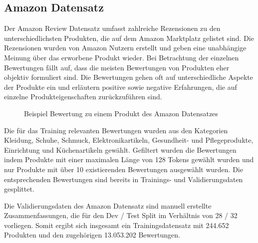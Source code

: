 \subsection{Amazon Datensatz}
Der Amazon Review Datensatz \citep{brazinskas2020-unsupervised} umfasst zahlreiche Rezensionen zu den unterschiedlichsten Produkten, die auf dem Amazon Marktplatz gelistet sind.
Die Rezensionen wurden von Amazon Nutzern erstellt und geben eine unabhängige Meinung über das erworbene Produkt wieder.
Bei Betrachtung der einzelnen Bewertungen fällt auf, dass die meisten Bewertungen von Produkten eher objektiv formuliert sind. 
Die Bewertungen gehen oft auf unterschiedliche Aspekte der Produkte ein und erläutern positive sowie negative Erfahrungen, die auf einzelne Produkteigenschaften zurückzuführen sind.

\setlength{\fboxsep}{1em}

\begin{figure}[!h]
    \centering
    \scriptsize
    \caption{Beispiel Bewertung zu einem Produkt des Amazon Datensatzes}
\end{figure}

Die für das Training relevanten Bewertungen wurden aus den Kategorien Kleidung, Schuhe, Schmuck, Elektronikartikeln, Gesundheit- und Pflegeprodukte, Einrichtung und Küchenartikeln gewählt.
Gefiltert wurden die Bewertungen indem Produkte mit einer maximalen Länge von 128 Tokens gewählt wurden und nur Produkte mit über 10 existierenden Bewertungen ausgewählt wurden. 
Die entsprechenden Bewertungen sind bereits in Trainings- und Validierungsdaten gesplittet.

Die Validierungsdaten des Amazon Datensatz sind manuell erstellte Zusammenfassungen, die für den Dev / Test Split im Verhältnis von 28 / 32 vorliegen.
Somit ergibt sich insgesamt ein Trainingsdatensatz mit 244.652 Produkten und den zugehörigen 13.053.202 Bewertungen.

